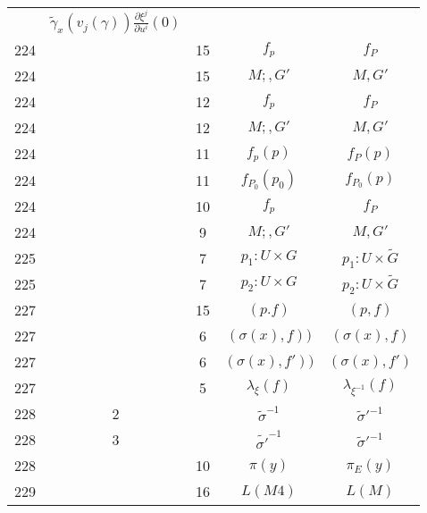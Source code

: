 \documentclass[a4paper,11pt]{article}
\begin{document}
\begin{center}
\begin{tabular}{|c|c|c|c|c|}
           & $\widetilde{ \gamma }_{ x }( v_{ j }( \gamma ) )
             \frac{ \partial \xi ^{ j } }{ \partial u^{ i } }( 0 )$ \\[0.2em]
    224 & & 15 & $f_{ p }$ & $f_{ P }$ \\
    224 & & 15 & $M;, G'$ & $M, G'$ \\
    224 & & 12 & $f_{ p }$ & $f_{ P }$ \\
    224 & & 12 & $M;, G'$ & $M, G'$ \\
    224 & & 11 & $f_{ p }( p )$ & $f_{ P }( p )$ \\
    224 & & 11 & $f_{ P_{ 0 } }( p_{ 0 } )$ & $f_{ P_{ 0 } }( p )$ \\
    224 & & 10 & $f_{ p }$ & $f_{ P }$ \\
    224 & &  9 & $M;, G'$ & $M, G'$ \\
    225 & &  7 & $p_{ 1 } : U \times G$
           & $p_{ 1 } : U \times \widetilde{ G }$ \\
    225 & &  7 & $p_{ 2 } : U \times G$
           & $p_{ 2 } : U \times \widetilde{ G }$ \\
    227 & & 15 & $( p. f )$ & $( p, f )$ \\
    227 & &  6 & $( \sigma( x ), f ) )$ & $( \sigma( x ), f )$ \\
    227 & &  6 & $( \sigma( x ), f' ) )$ & $( \sigma( x ), f' )$ \\
    227 & &  5 & $\lambda_{ \xi }( f )$ & $\lambda_{ \xi^{ -1 } }( f )$ \\[0.3em]
    228 &  2 & & $\widetilde{ \sigma }^{ -1 }$ & $\widetilde{ \sigma }'^{ -1 }$ \\
    228 &  3 & & $\widetilde{ \sigma' }^{ -1 }$ & $\widetilde{ \sigma }'^{ -1 }$ \\
    228 & & 10 & $\pi( y )$ & $\pi_{ E }( y )$ \\
    229 & & 16 & $L( M 4 )$ & $L( M )$ \\
    \hline
  \end{tabular}






\end{center}
\end{document}
